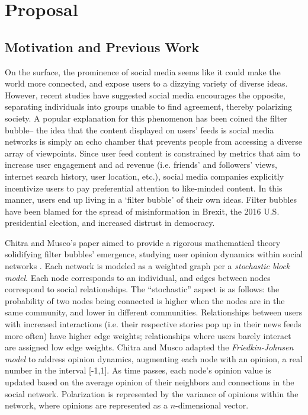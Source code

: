 \section*{Proposal}

\subsection*{Motivation and Previous Work}



On the surface, the prominence of social media seems like it could make 
the world more connected, and expose users to a dizzying variety of diverse
ideas. However, recent studies have suggested social media encourages the
opposite, separating individuals into groups unable to find agreement, thereby
polarizing society. A popular explanation for this phenomenon has been coined 
the filter bubble-- the idea that the content displayed on 
users’ feeds is social
media networks is simply an echo chamber that prevents people from accessing a
diverse array of viewpoints. Since user feed content is constrained by metrics
that aim to increase user engagement and ad revenue (i.e. friends’ and 
followers’
views, internet search history, user location, etc.), social media companies
explicitly incentivize users to pay preferential attention to like-minded
content. In this manner, users end up living in a ‘filter bubble’ of their own
ideas. Filter bubbles have been blamed for the spread of misinformation in
Brexit, the 2016 U.S. presidential election, and increased 
distrust in democracy.

Chitra and Musco’s paper aimed to provide a rigorous mathematical theory
solidifying filter bubbles’ emergence, studying user opinion dynamics within
social networks \cite{chitra_analyzing_2020}.
Each network is modeled as a weighted graph per a \emph{stochastic
block model}. Each node corresponds to an individual, and edges between nodes
correspond to social relationships. The “stochastic” aspect is as follows: the 
probability of two nodes being connected is higher 
when the nodes are in the same
community, and lower in different communities. Relationships between users with
increased interactions (i.e. their respective stories pop up in their news feeds
more often) have higher edge weights; relationships where users barely interact
are assigned low edge weights. Chitra and Musco 
adapted the \emph{Friedkin-Johnsen model}
to address opinion dynamics,  augmenting each 
node with an opinion, a real number
in the interval [-1,1]. As time passes, each node’s opinion value is updated
based on the average opinion of their neighbors and connections in the social
network. Polarization is represented by the variance of opinions within the
network, where opinions are represented as a $n$-dimensional vector.

